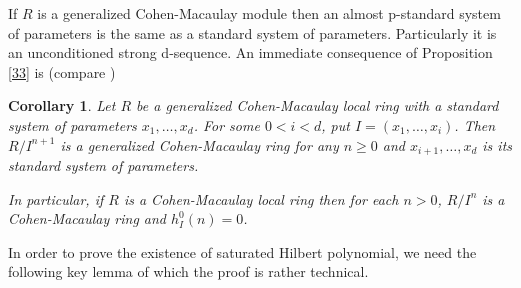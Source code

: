 \documentclass{amsart}
\newtheorem {corollary}[theorem]{Corollary}
\theoremstyle {definition}
\theoremstyle {remark}
\begin{document}
If $R$ is a generalized Cohen-Macaulay module then an almost p-standard system of parameters is the same as a standard system of parameters. Particularly it is an unconditioned strong d-sequence. An immediate consequence of Proposition \ref{33} is (compare \cite[Theorem 1.2]{LT})

\begin{corollary}\label{34}
Let $R$ be a generalized Cohen-Macaulay local ring with a standard system of parameters $x_1, \ldots, x_d$. For some $0<i<d$, put $I=(x_1, \ldots, x_i)$. Then $R/I^{n+1}$ is a generalized Cohen-Macaulay ring for any $n\geq 0$ and $x_{i+1}, \ldots, x_d$ is its standard system of parameters.

In particular, if $R$ is a Cohen-Macaulay local ring then for each $n>0$, $R/I^n$ is a Cohen-Macaulay ring and $h^0_I(n)=0$.
\end{corollary}

In order to prove the existence of saturated Hilbert polynomial, we need the following key lemma of which the proof is rather technical.
\end{document}
